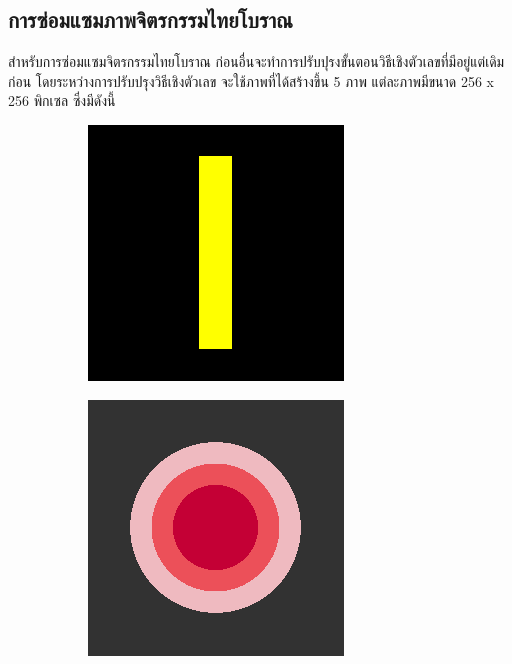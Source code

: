 \documentclass[hidelinks, a4paper,12pt]{article}
\numberwithin{equation}{section}							%
\numberwithin{equation}{section}
\begin{document}
{	\subsection{การซ่อมแซมภาพจิตรกรรมไทยโบราณ}
	\hspace{1cm} สำหรับการซ่อมแซมจิตรกรรมไทยโบราณ ก่อนอื่นจะทำการปรับปุรงขั้นตอนวิธีเชิงตัวเลขที่มีอยู่แต่เดิมก่อน โดยระหว่างการปรับปรุงวิธีเชิงตัวเลข จะใช้ภาพที่ได้สร้างขึ้น 5 ภาพ แต่ละภาพมีขนาด 256 x 256 พิกเซล ซึ่งมีดังนี้
	\begin{figure}[H]
		\centering
		\begin{subfigure}{0.15\linewidth}
			\centering
			\includegraphics[width=0.8\linewidth]{images/image_inpaint_synthetic/case01-original.png}
		\end{subfigure}
		\begin{subfigure}{0.15\linewidth}
			\centering
			\includegraphics[width=0.8\linewidth]{images/image_inpaint_synthetic/case02-original.png}

\end{subfigure}
\end{figure}}
\end{document}
